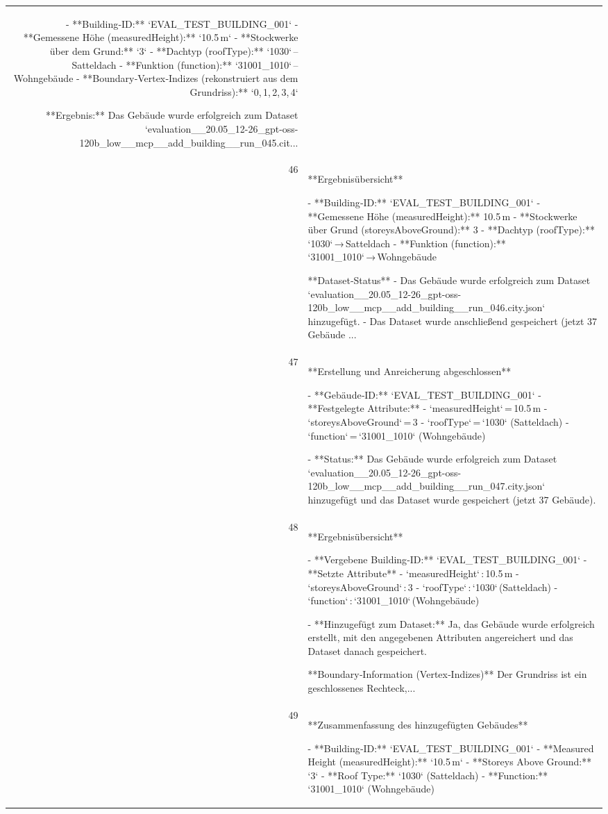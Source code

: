 \documentclass[a4paper,11pt]{article}
\begin{document}
\begin{table}[ht]
\begin{tabular}{r p{12cm}}
- **Building‑ID:** `EVAL\_TEST\_BUILDING\_001`  
- **Gemessene Höhe (measuredHeight):** `10.5 m`  
- **Stockwerke über dem Grund:** `3`  
- **Dachtyp (roofType):** `1030` – Satteldach  
- **Funktion (function):** `31001\_1010` – Wohngebäude  
- **Boundary‑Vertex‑Indizes (rekonstruiert aus dem Grundriss):** `0, 1, 2, 3, 4`  

**Ergebnis:** Das Gebäude wurde erfolgreich zum Dataset `evaluation\_\_20.05\_12-26\_gpt-oss-120b\_low\_\_mcp\_\_add\_building\_\_run\_045.cit... \\
46 & **Ergebnisübersicht**

- **Building‑ID:** `EVAL\_TEST\_BUILDING\_001`  
- **Gemessene Höhe (measuredHeight):** 10.5 m  
- **Stockwerke über Grund (storeysAboveGround):** 3  
- **Dachtyp (roofType):** `1030` → Satteldach  
- **Funktion (function):** `31001\_1010` → Wohngebäude  

**Dataset‑Status**  
- Das Gebäude wurde erfolgreich zum Dataset `evaluation\_\_20.05\_12-26\_gpt-oss-120b\_low\_\_mcp\_\_add\_building\_\_run\_046.city.json` hinzugefügt.  
- Das Dataset wurde anschließend gespeichert (jetzt 37 Gebäude ... \\
47 & **Erstellung und Anreicherung abgeschlossen**

- **Gebäude‑ID:** `EVAL\_TEST\_BUILDING\_001`  
- **Festgelegte Attribute:**  
  - `measuredHeight` = 10.5 m  
  - `storeysAboveGround` = 3  
  - `roofType` = `1030` (Satteldach)  
  - `function` = `31001\_1010` (Wohngebäude)  

- **Status:** Das Gebäude wurde erfolgreich zum Dataset `evaluation\_\_20.05\_12-26\_gpt-oss-120b\_low\_\_mcp\_\_add\_building\_\_run\_047.city.json` hinzugefügt und das Dataset wurde gespeichert (jetzt 37 Gebäude). \\
48 & **Ergebnisübersicht**

- **Vergebene Building‑ID:** `EVAL\_TEST\_BUILDING\_001`  
- **Setzte Attribute**  
  - `measuredHeight` : 10.5 m  
  - `storeysAboveGround` : 3  
  - `roofType` : `1030` (Satteldach)  
  - `function` : `31001\_1010` (Wohngebäude)  

- **Hinzugefügt zum Dataset:** Ja, das Gebäude wurde erfolgreich erstellt, mit den angegebenen Attributen angereichert und das Dataset danach gespeichert.  

**Boundary‑Information (Vertex‑Indizes)**  
Der Grundriss ist ein geschlossenes Rechteck,... \\
49 & **Zusammenfassung des hinzugefügten Gebäudes**

- **Building‑ID:** `EVAL\_TEST\_BUILDING\_001`  
- **Measured Height (measuredHeight):** `10.5 m`  
- **Storeys Above Ground:** `3`  
- **Roof Type:** `1030` (Satteldach)  
- **Function:** `31001\_1010` (Wohngebäude)  


\end{tabular}
\end{table}
\end{document}
